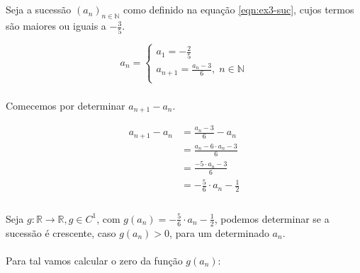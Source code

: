 \subsection{}

\paragraph{} Seja a sucessão $(a_n)_{n \in \mathbb{N}}$ como definido na
equação \ref{eqn:ex3-suc}, cujos termos são maiores ou iguais a
$-\frac{3}{5}$.

\begin{equation}
\label{eqn:ex3-suc}
	a_n = 
	\begin{cases}
		a_1 = -\frac{2}{5}\\
		a_{n + 1} = \frac{a_n - 3}{6}, \; n \in \mathbb{N}\\
	\end{cases}
\end{equation}

\subsubsection{}

\paragraph{} Comecemos por determinar $a_{n+1} - a_n$.

\begin{align*}
	a_{n+1} - a_n &= \frac{a_n - 3}{6} - a_n\\
	&= \frac{a_n - 6 \cdot a_n - 3}{6}\\
	&= \frac{- 5 \cdot a_n - 3}{6}\\
	&= -\frac{5}{6} \cdot a_n - \frac{1}{2}\\
\end{align*}

\paragraph{} Seja $g: \mathbb{R} \to \mathbb{R}, g \in C^1$, com
$g(a_n) = -\frac{5}{6} \cdot a_n - \frac{1}{2}$, podemos determinar se a
sucessão é crescente, caso $g(a_n) > 0$, para um determinado $a_n$.

\paragraph{} Para tal vamos calcular o zero da função $g(a_n)$:

